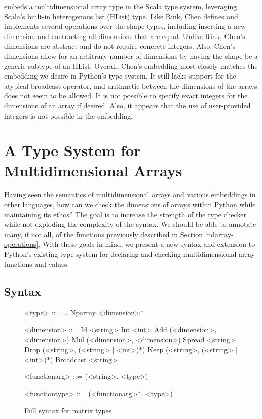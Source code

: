 \documentclass[12pt]{report}
\begin{document}
\cite{Chen2017TypesafeAF} embeds a multidimensional array type in the Scala type system, leveraging Scala's built-in heterogenous list (HList) type. Like Rink, Chen defines and implements several operations over the shape types, including inserting a new dimension and contracting all dimensions that are equal. Unlike Rink, Chen's dimensions are abstract and do not require concrete integers. Also, Chen's dimensions allow for an arbitrary number of dimensions by having the shape be a generic subtype of an HList. Overall, Chen's embedding most closely matches the embedding we desire in Python's type system. It still lacks support for the atypical broadcast operator, and arithmetic between the dimensions of the arrays does not seem to be allowed. It is not possible to specify exact integers for the dimensions of an array if desired. Also, it appears that the use of user-provided integers is not possible in the embedding.

\chapter{A Type System for Multidimensional Arrays}

Having seen the semantics of multidimensional arrays and various embeddings in other languages, how can we check the dimensions of arrays within Python while maintaining its ethos? The goal is to increase the strength of the type checker while not exploding the complexity of the syntax. We should be able to annotate many, if not all, of the functions previously described in Section \ref{ndarray-operations}. With these goals in mind, we present a new syntax and extension to Python's existing type system for declaring and checking multidimensional array functions and values.

\section{Syntax}

\begin{figure}
    \centering
    \begin{grammar}
        <type> ::= \ldots
        \alt Nparray <dimension>*

        <dimension> ::= Id <string>
        \alt Int <int>
        \alt Add (<dimension>, <dimension>)
        \alt Mul (<dimension>, <dimension>)
        \alt Spread <string>
        \alt Drop (<string>, (<string> | <int>)*)
        \alt Keep (<string>, (<string> | <int>)*)
        \alt Broadcast <string>

        <functionarg> ::= (<string>, <type>)

        <functiontype> ::= (<functionarg>*, <type>)

    \end{grammar}
    \caption{Full syntax for matrix types}
    \label{syntax}
\end{figure}
\end{document}
